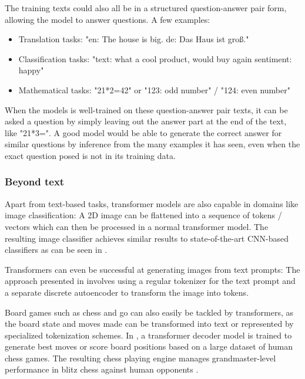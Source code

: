 The training texts could also all be in a structured question-answer pair form, allowing the model to answer questions. A few examples:
\label{transformer:examples}

\begin{itemize}
\item Translation tasks: "en: The house is big.  de: Das Haus ist groß."
\item Classification tasks: "text:  what a cool product, would buy again  sentiment: happy"
\item Mathematical tasks: "21*2=42" or "123: odd number" / "124: even number" 
\end{itemize}

When the models is well-trained on these question-answer pair texts, it can be asked a question by simply leaving out the answer part at the end of the text, like "21*3=". \cite{alammar-transformer} A good model would be able to generate the correct answer for similar questions by inference from the many examples it has seen, even when the exact question posed is not in its training data.

\subsubsection{Beyond text}

Apart from text-based tasks, transformer models are also capable in domains like image classification:
A 2D image can be flattened into a sequence of tokens / vectors which can then be processed in a normal transformer model. The resulting image classifier achieves similar results to state-of-the-art CNN-based classifiers as can be seen in .

Transformers can even be successful at generating images from text prompts: The approach presented in \cite{cogview} involves using a regular tokenizer for the text prompt and a separate discrete autoencoder to transform the image into tokens.

Board games such as chess and go can also easily be tackled by transformers, as the board state and moves made can be transformed into text or represented by specialized tokenization schemes.
In \cite{grandmasterlevelchess}, a transformer decoder model is trained to generate best moves or score board positions based on a large dataset of human chess games. The resulting chess playing engine manages grandmaster-level performance in blitz chess against human opponents .

